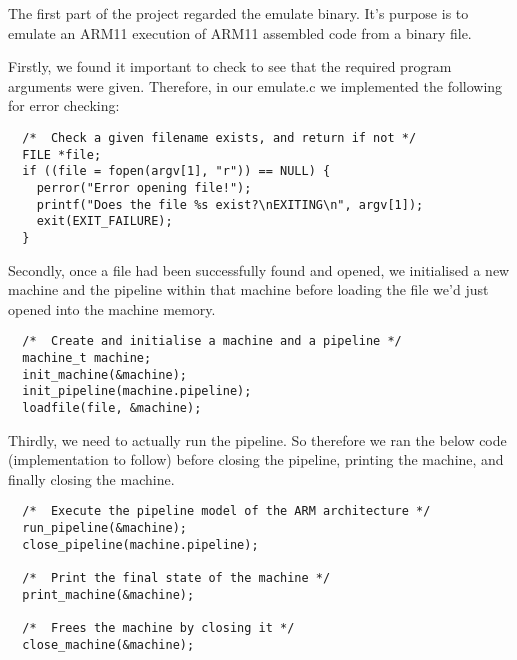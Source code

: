 The first part of the project regarded the emulate binary. It's purpose is to emulate an ARM11 execution of ARM11 assembled code from a binary file.

Firstly, we found it important to check to see that the required program arguments were given. Therefore, in our emulate.c we implemented the following for error checking:

\begin{verbatim}
  /*  Check a given filename exists, and return if not */
  FILE *file;
  if ((file = fopen(argv[1], "r")) == NULL) {
    perror("Error opening file!");
    printf("Does the file %s exist?\nEXITING\n", argv[1]);
    exit(EXIT_FAILURE);
  }
\end{verbatim}

Secondly, once a file had been successfully found and opened, we initialised a new machine and the pipeline within that machine before loading the file we'd just opened into the machine memory.

\begin{verbatim}
  /*  Create and initialise a machine and a pipeline */
  machine_t machine;
  init_machine(&machine);
  init_pipeline(machine.pipeline);
  loadfile(file, &machine);
\end{verbatim}

Thirdly, we need to actually run the pipeline. So therefore we ran the below code (implementation to follow) before closing the pipeline, printing the machine, and finally closing the machine.

\begin{verbatim}
  /*  Execute the pipeline model of the ARM architecture */
  run_pipeline(&machine);
  close_pipeline(machine.pipeline);

  /*  Print the final state of the machine */
  print_machine(&machine);

  /*  Frees the machine by closing it */
  close_machine(&machine);
\end{verbatim}

